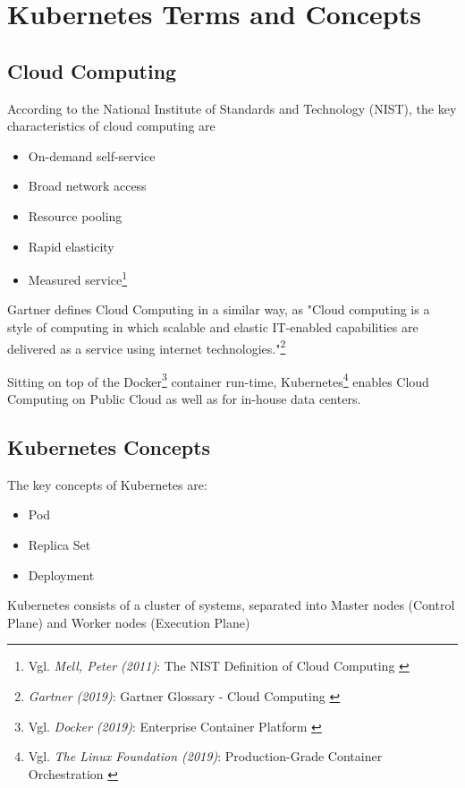 %
%

\pagebreak
\section{Kubernetes Terms and Concepts}

\onehalfspacing

\subsection{Cloud Computing}
According to the National Institute of Standards and Technology (NIST), the key characteristics of cloud computing are 
\begin{itemize}
\item On-demand self-service
\item Broad network access
\item Resource pooling
\item Rapid elasticity
\item Measured service\footnote{Vgl. \textit{Mell, Peter (2011)}: The NIST Definition of Cloud Computing \cite{sp800-145}}
\end{itemize}

Gartner defines Cloud Computing in a similar way, as "Cloud computing is a style of computing in which scalable and elastic IT-enabled capabilities are delivered as a service using internet technologies."\footnote{\textit{Gartner (2019)}: Gartner Glossary - Cloud Computing \cite{gartnerGlossary}}

Sitting on top of the Docker\footnote{Vgl. \textit{Docker (2019)}: Enterprise Container Platform \cite{docker}} container run-time, Kubernetes\footnote{Vgl. \textit{The Linux Foundation (2019)}: Production-Grade Container Orchestration \cite{kubernetes}} enables Cloud Computing on Public Cloud as well as for in-house data centers.

\subsection{Kubernetes Concepts}

The key concepts of Kubernetes are:
\begin{itemize}
\item Pod
\item Replica Set
\item Deployment
\end{itemize}

Kubernetes consists of a cluster of systems, separated into Master nodes (Control Plane) and Worker nodes (Execution Plane)
